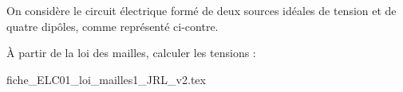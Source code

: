\hauteurLargeurCadreReponse		{7mm}{40mm}
\initialisationEntrainement


                                \initialisationPartieGauche %
On considère le circuit électrique formé de deux sources idéales de tension et de quatre dipôles, comme représenté ci-contre. 

\smallskip

À partir de la loi des mailles, calculer les tensions :

                                \initialisationPartieDroite %
\begin{center}
{fiche_ELC01_loi_mailles1_JRL_v2.tex}
\end{center}
                               \finalisationDuPartageDePage %

\bigskip
\debutEntrainement



